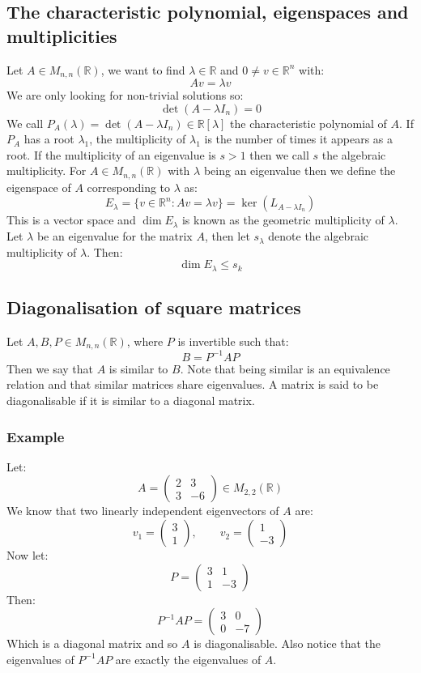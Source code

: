 \documentclass[12pt]{article}
\begin{document}
\subsection*{The characteristic polynomial, eigenspaces and multiplicities}
Let \(A\in M_{n,n}(\mathbb{R})\), we want to find \(\lambda\in \mathbb{R}\) and \(0\ne v\in \mathbb{R}^n\) with:
\[Av=\lambda v\]
We are only looking for non-trivial solutions so:
\[\det (A-\lambda I_n)=0\]
We call \(P_A(\lambda)=\det(A-\lambda I_n)\in \mathbb{R}[\lambda]\) the characteristic polynomial of \(A\). If \(P_A\) has a root \(\lambda_1\), the multiplicity of \(\lambda_1\) is the number of times it appears as a root. If the multiplicity of an eigenvalue is \(s>1\) then we call \(s\) the algebraic multiplicity. For \(A\in M_{n,n}(\mathbb{R})\) with \(\lambda\) being an eigenvalue then we define the eigenspace of \(A\) corresponding to \(\lambda\) as:
\[E_\lambda=\{v\in\mathbb{R}^n:Av=\lambda v\}=\ker(L_{A-\lambda I_n})\]
This is a vector space and \(\dim E_\lambda\) is known as the geometric multiplicity of \(\lambda\). Let \(\lambda\) be an eigenvalue for the matrix \(A\), then let \(s_\lambda\) denote the algebraic multiplicity of \(\lambda\). Then:
\[\dim E_\lambda \leq s_k\]
\subsection*{Diagonalisation of square matrices}
Let \(A,B,P\in M_{n,n}(\mathbb{R})\), where \(P\) is invertible such that:
\[B=P^{-1}AP\]
Then we say that \(A\) is similar to \(B\). Note that being similar is an equivalence relation and that similar matrices share eigenvalues. A matrix is said to be diagonalisable if it is similar to a diagonal matrix.
\subsubsection*{Example}
Let:
\[A=\begin{pmatrix}
    2 & 3 \\
    3 & -6
\end{pmatrix}\in M_{2,2}(\mathbb{R})\]
We know that two linearly independent eigenvectors of \(A\) are:
\[v_1=\begin{pmatrix}
    3 \\ 1
\end{pmatrix},\qquad v_2=\begin{pmatrix}
    1 \\ -3
\end{pmatrix}\]
Now let:
\[P=\begin{pmatrix}
    3 & 1 \\
    1 & -3
\end{pmatrix}\]
Then:
\[P^{-1}AP=\begin{pmatrix}
    3 & 0 \\
    0 & -7
\end{pmatrix}\]
Which is a diagonal matrix and so \(A\) is diagonalisable. Also notice that the eigenvalues of \(P^{-1}AP\) are exactly the eigenvalues of \(A\).
\end{document}
